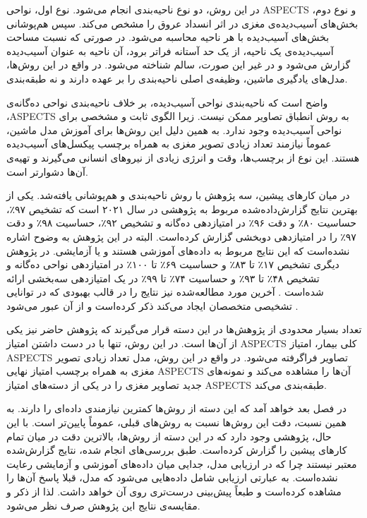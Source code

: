 در این روش، دو نوع ناحیه‌بندی انجام می‌شود.
نوع اول، نواحی ASPECTS و نوع دوم،
بخش‌های آسیب‌دیده‌ی مغزی در اثر انسداد عروق 
را مشخص می‌کند.
سپس هم‌پوشانی بخش‌های آسیب‌دیده با هر ناحیه محاسبه می‌شود.
در صورتی که نسبت مساحت آسیب‌دیده‌ی یک ناحیه، از یک حد آستانه فراتر برود، آن ناحیه به عنوان آسیب‌دیده گزارش می‌شود و در غیر این صورت، سالم شناخته می‌شود.
در واقع در این روش‌ها، مدل‌های یادگیری ماشین، وظیفه‌ی اصلی ناحیه‌بندی را بر عهده دارند و نه طبقه‌بندی.

واضح است که ناحیه‌بندی نواحی آسیب‌دیده، بر خلاف ناحیه‌بندی نواحی ده‌گانه‌ی ،ASPECTS
به روش انطباق تصاویر ممکن نیست.
زیرا الگوی ثابت و مشخصی برای نواحی آسیب‌دیده وجود ندارد.
به همین دلیل این روش‌ها برای آموزش مدل ماشین، عموماً نیازمند تعداد زیادی تصویر مغزی به همراه برچسب پیکسل‌های آسیب‌دیده هستند.
این نوع از برچسب‌ها، وقت و انرژی زیادی از نیرو‌های انسانی می‌گیرند و تهیه‌ی آن‌ها دشوارتر است.


در میان کارهای پیشین،
سه پژوهش با
روش ناحیه‌بندی و هم‌پوشانی
یافته‌شد.
یکی از بهترین نتایج 
گزارش‌داده‌شده مربوط به پژوهشی در سال ۲۰۲۱ است
\cite{naganuma2021alberta}
که
تشخیص
۹۷٪،
حساسیت
۸۰٪
و دقت 
۹۶٪
در امتیازدهی ده‌گانه و 
تشخیص
۹۲٪،
حساسیت
۹۸٪
و دقت 
۹۷٪
را
در امتیازدهی دوبخشی 
گزارش کرده‌است.
البته در این پژوهش به وضوح اشاره نشده‌است که این نتایج مربوط به داده‌های آموزشی هستند و یا آزمایشی.
در پژوهش دیگری
تشخیص
۱۷٪
تا
۸۳٪
و
حساسیت
۶۹٪
تا
۱۰۰٪
در امتیازدهی نواحی ده‌گانه و 
تشخیص
۴۸٪
تا
۹۳٪
و
حساسیت
۷۴٪
تا
۹۹٪
در یک امتیازدهی سه‌بخشی 
ارائه شده‌است \cite{naganuma2021alberta}.
آخرین مورد مطالعه‌شده نیز نتایج را در قالب 
بهبودی که در توانایی تشخیصی متخصصان ایجاد می‌کند ذکر کرده‌است و از آن عبور می‌شود \cite{chen2022improving}.

تعداد بسیار محدودی از پژوهش‌ها در این دسته قرار می‌گیرند
که پژوهش حاضر نیز یکی از آن‌ها است.
در این روش، تنها با در دست داشتن امتیاز ASPECTS کلی بیمار، امتیاز ASPECTS تصاویر فراگرفته می‌شود.
در واقع در این روش، مدل تعداد زیادی تصویر مغزی به همراه برچسب امتیاز نهایی ASPECTS آن‌ها را مشاهده می‌کند و 
نمونه‌های جدید تصاویر مغزی را در یکی از دسته‌های امتیاز
ASPECTS
طبقه‌بندی می‌کند.

در فصل بعد خواهد آمد که این دسته از روش‌ها کمترین نیاز‌مندی داده‌ای را دارند.
به همین نسبت، دقت این روش‌ها نسبت به روش‌های قبلی، عموماً پایین‌تر است.
با این حال، پژوهشی
\cite{golkonda2022automated}
وجود دارد که در این دسته از روش‌ها، بالاترین دقت 
در میان تمام کارهای پیشین
را گزارش کرده‌است.
طبق بررسی‌های انجام شده، نتایج گزارش‌شده معتبر نیستند
چرا که در ارزیابی مدل، جدایی میان داده‌های آموزشی و آزمایشی رعایت نشده‌است.
به عبارتی ارزیابی شامل داده‌هایی می‌شود که مدل، قبلا پاسخ آن‌ها را مشاهده کرده‌است و طبعاً پیش‌بینی درست‌تری روی آن خواهد داشت.
لذا از ذکر و مقایسه‌ی نتایج این پژوهش صرف نظر می‌شود.

